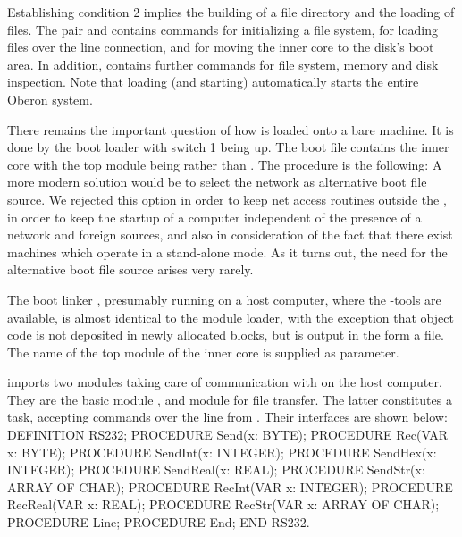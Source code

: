 Establishing condition 2 implies the building of a file directory and the loading of files. The pair  and  contains commands for initializing a file system, for loading files over the line connection, and for moving the inner core to the disk's boot area. In addition,  contains further commands for file system, memory and disk inspection. Note that loading (and starting)  automatically starts the entire Oberon system.

There remains the important question of how  is loaded onto a bare machine. It is done by the boot loader with switch 1 being up. The boot file contains the inner core with the top module being  rather than . The procedure is the following:
A more modern solution would be to select the network as alternative boot file source. We rejected this option in order to keep net access routines outside the , in order to keep the startup of a computer independent of the presence of a network and foreign sources, and also in consideration of the fact that there exist machines which operate in a stand-alone mode. As it turns out, the need for the alternative boot file source arises very rarely.

The boot linker , presumably running on a host computer, where the -tools are available, is almost identical to the module loader, with the exception that object code is not deposited in newly allocated blocks, but is output in the form a file. The name of the top module of the inner core is supplied as parameter.

 imports two modules taking care of communication with  on the host computer. They are the basic module , and module  for file transfer. The latter constitutes a task, accepting commands over the line from . Their interfaces are shown below:
\begintt
DEFINITION RS232;
  PROCEDURE Send(x: BYTE);
  PROCEDURE Rec(VAR x: BYTE);
  PROCEDURE SendInt(x: INTEGER);
  PROCEDURE SendHex(x: INTEGER);
  PROCEDURE SendReal(x: REAL);
  PROCEDURE SendStr(x: ARRAY OF CHAR);
  PROCEDURE RecInt(VAR x: INTEGER);
  PROCEDURE RecReal(VAR x: REAL);
  PROCEDURE RecStr(VAR x: ARRAY OF CHAR);
  PROCEDURE Line;
  PROCEDURE End;
END RS232.

